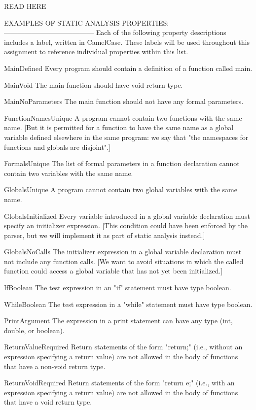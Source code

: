 \documentclass{article}
\begin{document}
READ HERE

EXAMPLES OF STATIC ANALYSIS PROPERTIES:
---------------------------------------
Each of the following property descriptions includes a label, written
in CamelCase.  These labels will be used throughout this assignment
to reference individual properties within this list.

MainDefined
  Every program should contain a definition of a function called
  main.

MainVoid
  The main function should have void return type.

MainNoParameters
  The main function should not have any formal parameters.

FunctionNamesUnique
  A program cannot contain two functions with the same name.  [But
  it is permitted for a function to have the same name as a global
  variable defined elsewhere in the same program: we say that "the
  namespaces for functions and globals are disjoint".]

FormalsUnique
  The list of formal parameters in a function declaration cannot
  contain two variables with the same name.

GlobalsUnique
  A program cannot contain two global variables with the same
  name.

GlobalsInitialized
  Every variable introduced in a global variable declaration must
  specify an initializer expression.  [This condition could have
  been enforced by the parser, but we will implement it as part of
  static analysis instead.]

GlobalsNoCalls
  The initializer expression in a global variable declaration must
  not include any function calls.  [We want to avoid situations in
  which the called function could access a global variable that
  has not yet been initialized.]

IfBoolean
  The test expression in an "if" statement must have type boolean.

WhileBoolean
  The test expression in a "while" statement must have type
  boolean.

PrintArgument
  The expression in a print statement can have any type (int,
  double, or boolean).

ReturnValueRequired
  Return statements of the form "return;" (i.e., without an
  expression specifying a return value) are not allowed in the
  body of functions that have a non-void return type.

ReturnVoidRequired
  Return statements of the form "return e;" (i.e., with an
  expression specifying a return value) are not allowed in the
  body of functions that have a void return type.
\end{document}
